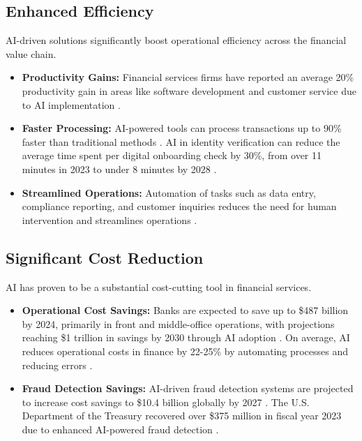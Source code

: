 \subsection{Enhanced Efficiency}
AI-driven solutions significantly boost operational efficiency across the financial value chain.
\begin{itemize}
    \item \textbf{Productivity Gains:} Financial services firms have reported an average 20\% productivity gain in areas like software development and customer service due to AI implementation \cite{Bain_AI_Finance}.
    \item \textbf{Faster Processing:} AI-powered tools can process transactions up to 90\% faster than traditional methods \cite{ArtSmart_AI_Finance}. AI in identity verification can reduce the average time spent per digital onboarding check by 30\%, from over 11 minutes in 2023 to under 8 minutes by 2028 \cite{JuniperResearch_AI_Finance}.
    \item \textbf{Streamlined Operations:} Automation of tasks such as data entry, compliance reporting, and customer inquiries reduces the need for human intervention and streamlines operations \cite{Ocrolus_AI_Finance}.
\end{itemize}

\subsection{Significant Cost Reduction}
AI has proven to be a substantial cost-cutting tool in financial services.
\begin{itemize}
    \item \textbf{Operational Cost Savings:} Banks are expected to save up to \$487 billion by 2024, primarily in front and middle-office operations, with projections reaching \$1 trillion in savings by 2030 through AI adoption \cite{ArtSmart_AI_Finance}. On average, AI reduces operational costs in finance by 22-25\% by automating processes and reducing errors \cite{ArtSmart_AI_Finance}.
    \item \textbf{Fraud Detection Savings:} AI-driven fraud detection systems are projected to increase cost savings to \$10.4 billion globally by 2027 \cite{RapidCanvas_AI_Finance}. The U.S. Department of the Treasury recovered over \$375 million in fiscal year 2023 due to enhanced AI-powered fraud detection \cite{BizTechMagazine_AI_Finance}.
\end{itemize}

